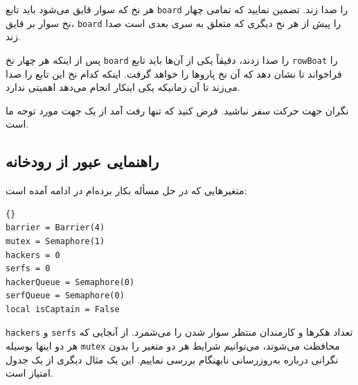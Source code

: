 \documentclass{book}
\newcommand{\clearemptydoublepage}{\newpage\cleardoublepage}
\begin{document}
    هر نخ که سوار قایق می‌شود باید تابع  {\tt board} را صدا زند. تضمین نمایید که تمامی چهار نخ سوار بر قایق،  {\tt board} را 
    پیش از هر نخ دیگری که متعلق به سری بعدی است صدا زند. 
    

    پس از اینکه هر چهار نخ  {\tt board} را صدا زدند، دقیقاً یکی از آن‌ها باید تابع {\tt rowBoat} را فراخواند تا نشان دهد که آن نخ 
    پاروها را خواهد گرفت. اینکه کدام نخ این تابع را صدا می‌زند تا آن زمانیکه یکی اینکار انجام می‌دهد اهمیتی ندارد. 

    نگران جهت حرکت سفر نباشید. فرض کنید که تنها رفت آمد از یک جهت مورد توجه ما است. 


\clearemptydoublepage
\subsection {راهنمایی عبور از رودخانه}

    متغیرهایی که در حل مسأله بکار برده‌ام در ادامه آمده است:‌

\begin{latin}
\begin{lstlisting}[title=\rl{راهنمایی عبور از رودخانه}]{}
barrier = Barrier(4)
mutex = Semaphore(1)
hackers = 0
serfs = 0
hackerQueue = Semaphore(0)
serfQueue = Semaphore(0)
local isCaptain = False
\end{lstlisting}
\end{latin}

    {\tt hackers} و {\tt serfs}
    تعداد هکرها و کارمندان منتظر سوار شدن را می‌شمرد. از آنجایی که هر دو اینها بوسیله {\tt mutex} محافظت می‌شوند، می‌توانیم شرایط هر دو متغیر را 
    بدون نگرانی درباره به‌روزرسانی‌ نابهنگام بررسی نماییم. این یک مثال دیگری از یک جدول امتیاز است. 
\end{document}
